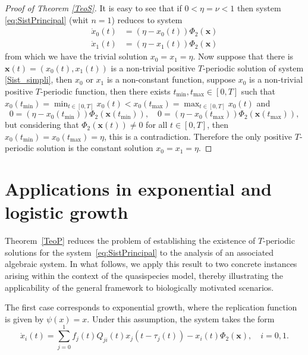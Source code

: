 \documentclass[11pt,reqno]{amsart}
\theoremstyle{definition}
\begin{document}
\begin{proof}[Proof of Theorem \ref{TeoS}]
It is easy to see that if $0<\eta=\nu<1$ then system \eqref{eq:SistPrincipal} (whit $n=1$) reduces to system
\begin{equation}\label{Sist_simpli}
\begin{array}{lr} 
    \dot x_0(t)& = (\eta - x_0(t)) \Phi_{2}(\mathbf{x})\\
    \dot x_1(t)& = (\eta - x_1(t)) \Phi_{2}(\mathbf{x})
     \end{array}
\end{equation}
from which we have the trivial solution $x_0=x_1=\eta$. 
Now suppose that there is $\mathbf x(t)=(x_0(t),x_1(t))$ is a non-trivial positive $T$-periodic solution of system \eqref{Sist_simpli}, then $x_0$ or $x_1$ is a non-constant function, suppose $x_0$ is a non-trivial positive $T$-periodic function, then there exists $t_{\min},t_{\max}\in[0,T]$ such that $x_0(t_{\min})=\min_{t\in[0,T]} x_0(t)<x_0(t_{\max})=\max_{t\in[0,T]} x_0(t)$ and $$0 = (\eta - x_0(t_{\min})) \Phi_{2}(\mathbf{x}(t_{\min})),\quad 0 = (\eta - x_0(t_{\max})) \Phi_{2}(\mathbf{x}(t_{\max})),$$
but considering that $\Phi_{2}(\mathbf{x}(t))\neq0$ for all $t\in[0,T]$, then $x_0(t_{\min})=x_0(t_{\max})=\eta$, this is a contradiction. Therefore the only positive $T$-periodic solution is the constant solution $x_0=x_1=\eta$.
\end{proof}
\section{Applications in exponential and logistic growth}\label{sec:applications}

Theorem~\ref{TeoP} reduces the problem of establishing the existence of $T$-periodic solutions for the system~\eqref{eq:SistPrincipal} to the analysis of an associated algebraic system. In what follows, we apply this result to two concrete instances arising within the context of the quasispecies model, thereby illustrating the applicability of the general framework to biologically motivated scenarios.

The first case corresponds to exponential growth, where the replication function is given by $\psi(x) = x$. Under this assumption, the system takes the form
\begin{equation}\label{App1}
\dot x_i(t) = \sum_{j=0}^1 f_j(t) Q_{ji}(t) x_j(t-\tau_{j}(t)) - x_i(t) \Phi_{2}(\mathbf{x}), \quad i = 0, 1.
\end{equation}
\end{document}
